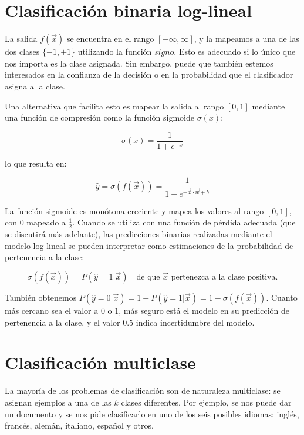 \section{Clasificación binaria log-lineal}
La salida $f(\vec{x})$ se encuentra en el rango $[-\infty,\infty]$, y la mapeamos a una de las dos clases $\{-1,+1\}$ utilizando la función $signo$. Esto es adecuado si lo único que nos importa es la clase asignada. Sin embargo, puede que también estemos interesados en la confianza de la decisión o en la probabilidad que el clasificador asigna a la clase.

Una alternativa que facilita esto es mapear la salida al rango $[0,1]$ mediante una función de compresión como la función sigmoide $\sigma(x)$:

\begin{equation}
\sigma(x) = \frac{1}{1+e^{-x}}
\end{equation}

lo que resulta en:

\begin{equation}
\hat{y}=\sigma(f(\vec{x})) = \frac{1}{1+e^{-\vec{x}\cdot \vec{w}+b}}
\end{equation}

La función sigmoide es monótona creciente y mapea los valores al rango $[0, 1]$, con $0$ mapeado a $\frac{1}{2}$. Cuando se utiliza con una función de pérdida adecuada (que se discutirá más adelante), las predicciones binarias realizadas mediante el modelo log-lineal se pueden interpretar como estimaciones de la probabilidad de pertenencia a la clase:

\begin{equation}
 \sigma(f(\vec{x})) = P(\hat{y} = 1| \vec{x}) \quad \text{de que $\vec{x}$ pertenezca a la clase positiva.}
\end{equation}

También obtenemos $P(\hat{y} = 0| \vec{x}) = 1 - P(\hat{y} = 1| \vec{x}) = 1-\sigma(f(\vec{x}))$. Cuanto más cercano sea el valor a $0$ o $1$, más seguro está el modelo en su predicción de pertenencia a la clase, y el valor $0.5$ indica incertidumbre del modelo.

\section{Clasificación multiclase}
La mayoría de los problemas de clasificación son de naturaleza multiclase: se asignan ejemplos a una de las $k$ clases diferentes. Por ejemplo, se nos puede dar un documento y se nos pide clasificarlo en uno de los seis posibles idiomas: inglés, francés, alemán, italiano, español y otros.

